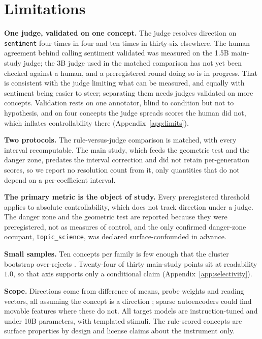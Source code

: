 \documentclass{article}
\begin{document}
\section{Limitations}
\label{sec:limitations}

\textbf{One judge, validated on one concept.} The judge resolves direction on
\texttt{sentiment} four times in four and ten times in thirty-six elsewhere.
The human agreement behind calling sentiment validated was measured on the
1.5B main-study judge; the 3B judge used in the matched comparison has not yet
been checked against a human, and a preregistered round doing so is in
progress. That is consistent with the judge limiting what can be
measured, and equally with sentiment being easier to steer; separating them
needs judges validated on more concepts. Validation rests on one annotator,
blind to condition but not to hypothesis, and on four concepts the judge spreads
scores the human did not, which inflates controllability there
(Appendix~\ref{app:limits}).

\textbf{Two protocols.} The rule-versus-judge comparison is matched, with every
interval recomputable. The main study, which feeds the geometric test and the
danger zone, predates the interval correction and did not retain per-generation
scores, so we report no resolution count from it, only quantities that do not
depend on a per-coefficient interval.

\textbf{The primary metric is the object of study.} Every preregistered
threshold applies to absolute controllability, which does not track direction
under a judge. The danger zone and the geometric test are reported because they
were preregistered, not as measures of control, and the only confirmed
danger-zone occupant, \texttt{topic\_science}, was declared surface-confounded in
advance.

\textbf{Small samples.} Ten concepts per family is few enough that the cluster
bootstrap over-rejects \citep{cameron2008bootstrap}. Twenty-four of thirty
main-study points sit at readability $1.0$, so that axis supports only a
conditional claim (Appendix~\ref{app:selectivity}).

\textbf{Scope.} Directions come from difference of means, probe weights and
reading vectors, all assuming the concept is a direction \citep{park2024linear};
sparse autoencoders \citep{cunningham2024sae} could find movable features where
these do not. All target models are instruction-tuned and under 10B parameters,
with templated stimuli. The rule-scored concepts are surface properties by design
and license claims about the instrument only.
\end{document}

